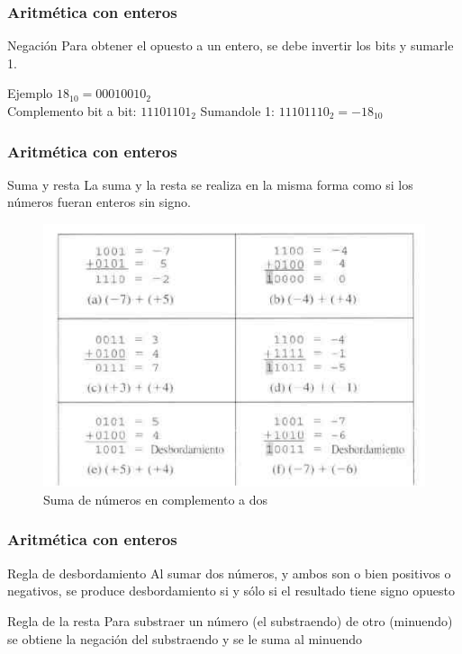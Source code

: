 \documentclass{beamer}
\begin{document}
\begin{frame}
	\frametitle{Aritmética con enteros}
	\begin{block}{Negación}
		Para obtener el opuesto a un entero, se debe invertir los bits y sumarle 1.
	\end{block}	
	\begin{exampleblock}{Ejemplo}
	 	$18_{10} = 00010010_{2}$ \\
	 	Complemento bit a bit: $11101101_{2}$
	 	Sumandole 1: $11101110_{2} = -18_{10}$
	\end{exampleblock}
\end{frame}


\begin{frame}
	\frametitle{Aritmética con enteros}
	\begin{block}{Suma y resta}
		La suma y la resta se realiza en la misma forma como si los números fueran enteros sin signo.
	\end{block}	
	\vspace{-0.3cm}
	\begin{figure}[H]
		\centering
		\includegraphics[scale=0.45]{imagenes/sumaresta.png}
		\caption{Suma de números en complemento a dos}
	\end{figure}
\end{frame}


\begin{frame}
	\frametitle{Aritmética con enteros}
	\begin{alertblock}{Regla de desbordamiento}
	Al sumar dos números, y ambos son o bien positivos o negativos, se produce desbordamiento si y sólo si el resultado tiene signo opuesto
	\end{alertblock}
	\begin{alertblock}{Regla de la resta}
	Para substraer un número (el substraendo) de otro (minuendo) se obtiene la negación del substraendo y se le suma al minuendo
	\end{alertblock}
\end{frame}
\end{document}
